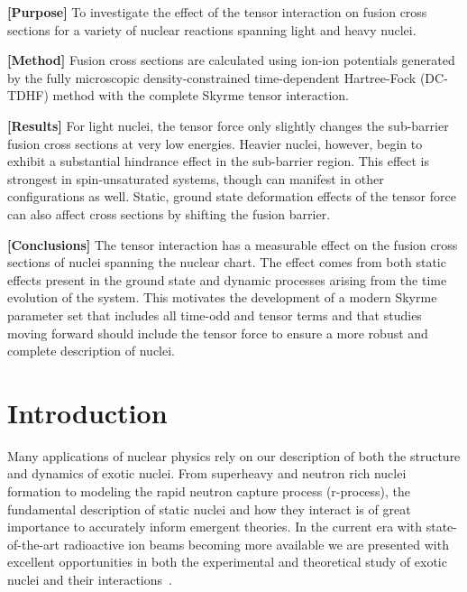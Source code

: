 		{\bf [Purpose]}
		To investigate the effect of the tensor interaction on fusion cross sections for a variety of nuclear reactions spanning light and heavy nuclei.
		
		{\bf [Method]}
		Fusion cross sections are calculated using ion-ion potentials generated by the fully microscopic density-constrained time-dependent Hartree-Fock (DC-TDHF) method with the complete Skyrme tensor interaction.
		
		{\bf [Results]}
		For light nuclei, the tensor force only slightly changes the sub-barrier fusion cross sections at very low energies.
		Heavier nuclei, however, begin to exhibit a substantial hindrance effect in the sub-barrier region.
		This effect is strongest in spin-unsaturated systems, though can manifest in other configurations as well.
		Static, ground state deformation effects of the tensor force can also affect cross sections by shifting the fusion barrier.
		
		{\bf [Conclusions]}
		The tensor interaction has a measurable effect on the fusion cross sections of nuclei spanning the nuclear chart.
		The effect comes from both static effects present in the ground state and dynamic processes arising from the time evolution of the system.
		This motivates the development of a modern Skyrme parameter set that includes all time-odd and tensor terms and that studies moving forward should include the tensor force to ensure a more robust and complete description of nuclei.





\section{Introduction}
\label{ch5:introduction}
Many applications of nuclear physics rely on our description of both the structure and dynamics of exotic nuclei.
From superheavy and neutron rich nuclei formation to modeling the rapid neutron capture process (r-process), the fundamental description of static nuclei and how they interact is of great importance to accurately inform emergent theories.
In the current era with state-of-the-art radioactive ion beams becoming more available we are presented with excellent opportunities in both the experimental and theoretical study of exotic nuclei and their interactions~\citep{balantekin2014}.

